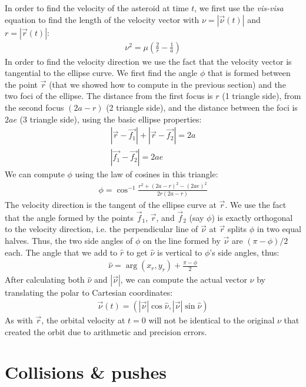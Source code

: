 \begin{appendices}
In order to find the velocity of the asteroid at time $t$, we first use the \emph{vis-visa} equation to find the length of the velocity vector with $\nu = |\vec{\nu}(t)|$ and $r = |\vec{r}(t)|$:
\begin{eqnarray*}
\nu^2 = \mu(\frac{2}{r} - \frac{1}{a})
\end{eqnarray*}
In order to find the velocity direction we use the fact that the velocity vector is tangential to the ellipse curve. We first find the angle $\phi$ that is formed between the point $\vec{r}$ (that we showed how to compute in the previous section) and the two foci of the ellipse. The distance from the first focus is $r$ (1 triangle side), from the second focus $(2a - r)$ (2 triangle side), and the distance between the foci is $2ae$ (3 triangle side), using the basic ellipse properties:
\begin{eqnarray*}
|\vec{r} - \vec{f_1}| + |\vec{r} - \vec{f_2}| = 2a\\
|\vec{f_1} - \vec{f_2}| = 2ae
\end{eqnarray*}
We can compute $\phi$ using the law of cosines in this triangle:
\begin{eqnarray*}
\phi=\cos^{-1}\frac{r^2+(2a-r)^2-(2ae)^2}{2r(2a-r)}
\end{eqnarray*}
The velocity direction is the tangent of the ellipse curve at $\vec{r}$. We use the fact that the angle formed by the points $\vec{f}_1$, $\vec{r}$, and $\vec{f}_2$ (say $\phi$) is exactly orthogonal to the velocity direction, i.e. the perpendicular line of $\vec{\nu}$ at $\vec{r}$ splits $\phi$ in two equal halves. Thus, the two side angles of $\phi$ on the line formed by $\vec{\nu}$ are $(\pi - \phi) / 2$ each. The angle that we add to $\hat{r}$ to get $\hat{\nu}$ is vertical to $\phi$'s side angles, thus:
\begin{eqnarray*}
\hat{\nu} = \arg(x_r,y_r) + \frac{\pi-\phi}{2}
\end{eqnarray*}
After calculating both $\hat{\nu}$ and $|\vec{\nu}|$, we can compute the actual vector $\nu$ by translating the polar to Cartesian coordinates:
\begin{eqnarray*}
\vec{\nu}(t) = (|\vec{\nu}| \cos{\hat{\nu}}, |\vec{\nu}| \sin{\hat{\nu}})
\end{eqnarray*}
As with $\vec{r}$, the orbital velocity at $t = 0$ will not be identical to the original $\nu$ that created the orbit due to arithmetic and precision errors.

\section{Collisions \& pushes}


\end{appendices}

